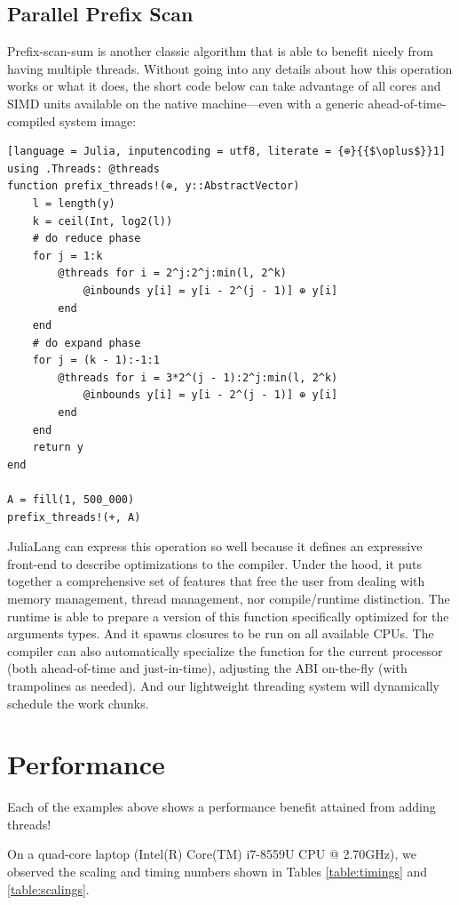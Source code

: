 \documentclass{juliacon}
\begin{document}
\subsection{Parallel Prefix Scan}
\label{subsub:ppscan}

Prefix-scan-sum is another classic algorithm that is able to benefit nicely from having multiple threads. Without going into any details about how this operation works or what it does, the short code below can take advantage of all cores and SIMD units available on the native machine—even with a generic ahead-of-time-compiled system image:

\begin{lstlisting}[language = Julia, inputencoding = utf8, literate = {⊕}{{$\oplus$}}1]
using .Threads: @threads
function prefix_threads!(⊕, y::AbstractVector)
    l = length(y)
    k = ceil(Int, log2(l))
    # do reduce phase
    for j = 1:k
        @threads for i = 2^j:2^j:min(l, 2^k)
            @inbounds y[i] = y[i - 2^(j - 1)] ⊕ y[i]
        end
    end
    # do expand phase
    for j = (k - 1):-1:1
        @threads for i = 3*2^(j - 1):2^j:min(l, 2^k)
            @inbounds y[i] = y[i - 2^(j - 1)] ⊕ y[i]
        end
    end
    return y
end

A = fill(1, 500_000)
prefix_threads!(+, A)
\end{lstlisting}

JuliaLang can express this operation so well because it defines an expressive front-end to describe optimizations to the compiler. Under the hood, it puts together a comprehensive set of features that free the user from dealing with memory management, thread management, nor compile/runtime distinction. The runtime is able to prepare a version of this function specifically optimized for the arguments types. And it spawns closures to be run on all available CPUs. The compiler can also automatically specialize the function for the current processor (both ahead-of-time and just-in-time), adjusting the ABI on-the-fly (with trampolines as needed). And our lightweight threading system will dynamically schedule the work chunks.

\section{Performance}
\label{subsub:performance}

Each of the examples above shows a performance benefit attained from adding threads!

On a quad-core laptop (Intel(R) Core(TM) i7-8559U CPU @ 2.70GHz), we observed the scaling and timing numbers shown in Tables \ref{table:timings} and \ref{table:scalings}.
\end{document}
